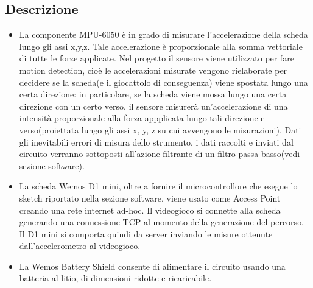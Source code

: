 \documentclass[documentation.tex]{subfiles}
\begin{document}
		\subsection{Descrizione}
		\begin{itemize}
		\item La componente MPU-6050 è in grado di misurare l'accelerazione della scheda lungo gli assi x,y,z. Tale accelerazione è proporzionale alla somma vettoriale di tutte le forze applicate. Nel progetto il sensore viene utilizzato per fare motion detection, cioè le accelerazioni misurate vengono rielaborate per decidere se la scheda(e il giocattolo di conseguenza) viene spostata lungo una certa direzione: in particolare, se la scheda viene mossa lungo una certa direzione con un certo verso, il sensore misurerà un'accelerazione di una intensità proporzionale alla forza appplicata lungo tali direzione e verso(proiettata lungo gli assi x, y, z su cui avvengono le misurazioni). Dati gli inevitabili errori di misura dello strumento, i dati raccolti e inviati dal circuito verranno sottoposti all'azione filtrante di un filtro passa-basso(vedi sezione software).
		\item La scheda Wemos D1 mini, oltre a fornire il microcontrollore che esegue lo sketch riportato nella sezione software, viene usato come Access Point creando una rete internet ad-hoc. Il videogioco si connette alla scheda generando una connessione TCP al momento della generazione del percorso. Il D1 mini si comporta quindi da server inviando le misure ottenute dall'accelerometro al videogioco.
		\item La Wemos Battery Shield consente di alimentare il circuito usando una batteria al litio, di dimensioni ridotte e ricaricabile.
		\end{itemize}
\end{document}

